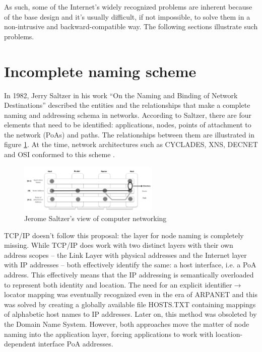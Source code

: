     As such, some of the Internet's widely recognized problems are inherent because of the base design and it's usually difficult, if not impossible, to solve them in a non-intrusive and backward-compatible way. The following sections illustrate such problems.

    \section{Incomplete naming scheme}

        In 1982, Jerry Saltzer in his work ``On the Naming and Binding of Network Destinations'' \cite{rfc1498} described the entities and the relationships that make a complete naming and addressing schema in networks. According to Saltzer, there are four elements that need to be identified: applications, nodes, points of attachment to the network (PoAs) and paths. The relationships between them are illustrated in figure \ref{fig:saltzer}. At the time, network architectures such as CYCLADES, XNS, DECNET and OSI conformed to this scheme \cite{internet_demo}.

        \begin{figure}[H]
            \begin{center}
                \includegraphics[width=0.6\textwidth]{fig/problems_saltzer.png}
              \caption{Jerome Saltzer's view of computer networking}
              \label{fig:saltzer}
            \end{center}
        \end{figure}

        TCP/IP doesn't follow this proposal: the layer for node naming is completely missing. While TCP/IP does work with two distinct layers with their own address scopes -- the Link Layer with physical addresses and the Internet layer with IP addresses -- both effectively identify the same: a host interface, i.e. a PoA address. This effectively means that the IP addressing is semantically overloaded to represent both identity and location. The need for an explicit identifier$\rightarrow$locator mapping was eventually recognized even in the era of ARPANET and this was solved by creating a globally available file HOSTS.TXT containing mappings of alphabetic host names to IP addresses. Later on, this method was obsoleted by the Domain Name System. However, both approaches move the matter of node naming into the application layer, forcing applications to work with location-dependent interface PoA addresses.

